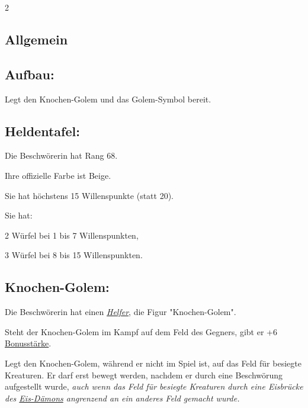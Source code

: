 \documentclass[10pt, a4paper, oneside]{book}
\newcommand{\fan}[1]{\textit{#1}}
\begin{document}
\begin{multicols*}{2}\raggedcolumns


\begin{nobgcolor}


\section{Allgemein}


\subsection{Aufbau:} 

Legt den Knochen-Golem und das Golem-Symbol bereit.





\subsection{Heldentafel:}

Die Beschwörerin hat Rang 68.

Ihre offizielle Farbe ist Beige.

Sie hat höchstens 15 Willenspunkte (statt 20).

Sie hat:

\bullet{} 2 Würfel bei 1 bis 7 Willenspunkten,

\bullet{} 3 Würfel bei 8 bis 15 Willenspunkten.





\subsection{Knochen-Golem:}



Die Beschwörerin hat einen \hyperref[Helfer]{\fan{Helfer}}, die Figur "Knochen-Golem".

Steht der Knochen-Golem im Kampf auf dem Feld des Gegners, gibt er +6 \hyperref[Bonusstärke]{Bonusstärke}.
\supercite{DH:Knochen-Golem}


Legt den Knochen-Golem, während er nicht im Spiel ist, auf das Feld für besiegte Kreaturen.
\supercite{DH:Knochen-Golem}
Er darf erst bewegt werden, nachdem er durch eine Beschwörung aufgestellt wurde, \fan{auch wenn das Feld für besiegte Kreaturen durch eine Eisbrücke des \hyperref[Eis-Dämon]{Eis-Dämons} angrenzend an ein anderes Feld gemacht wurde.}








\end{nobgcolor}
\end{multicols*}
\end{document}
